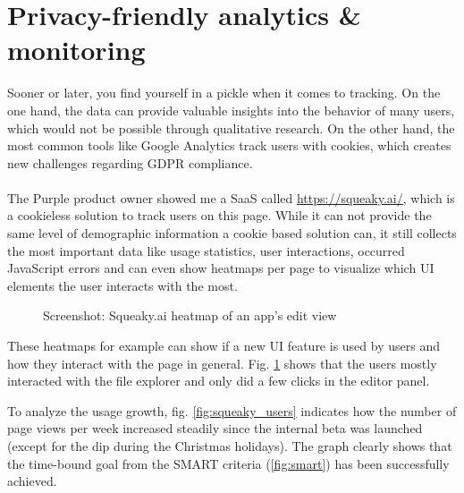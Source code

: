 \section{Privacy-friendly analytics \& monitoring}
\label{sec:analytics}

Sooner or later, you find yourself in a pickle when it comes to tracking.
On the one hand, the data can provide valuable insights into the behavior of many users, which would not be possible through qualitative research.
On the other hand, the most common tools like Google Analytics track users with cookies, which creates new challenges regarding GDPR compliance.
\\\\
The Purple product owner showed me a SaaS called \url{https://squeaky.ai/}, which is a cookieless solution to track users on this page.
While it can not provide the same level of demographic information a cookie based solution can, it still collects the most important data like usage statistics,
user interactions, occurred JavaScript errors and can even show heatmaps per page to visualize which UI elements the user interacts with the most.

\begin{figure}[h]
  \centering
  \caption{Screenshot: Squeaky.ai heatmap of an app's edit view}
  \label{fig:squeaky}
\end{figure}

These heatmaps for example can show if a new UI feature is used by users and how they interact with the page in general.
Fig. \ref{fig:squeaky} shows that the users mostly interacted with the file explorer and only did a few clicks in the editor panel.

To analyze the usage growth, fig. \ref{fig:squeaky_users} indicates how the number of page views per week increased steadily since the internal beta was launched (except for the dip during the Christmas holidays).
The graph clearly shows that the time-bound goal from the SMART criteria (\ref{fig:smart}) has been successfully achieved.

